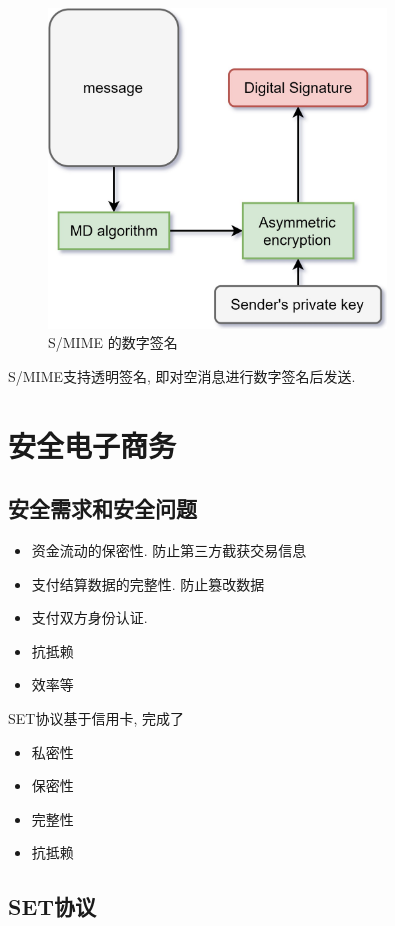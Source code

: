 \documentclass{ctexart}
\begin{document}
    \begin{figure}[ht!]
    \centering
    \includegraphics[width=0.8\textwidth]{s-mime-ds.jpg}
    \caption{S/MIME 的数字签名}
    \label{s-mime-ds}
    \end{figure}
    
    S/MIME支持透明签名, 即对空消息进行数字签名后发送.

\section{安全电子商务}
\subsection{安全需求和安全问题}
    \begin{itemize}
        \item 资金流动的保密性. 防止第三方截获交易信息
        \item 支付结算数据的完整性. 防止篡改数据
        \item 支付双方身份认证.
        \item 抗抵赖
        \item 效率等
    \end{itemize}
    SET协议基于信用卡, 完成了\begin{itemize}
        \item 私密性
        \item 保密性
        \item 完整性
        \item 抗抵赖
    \end{itemize}
\subsection{SET协议}
\end{document}
